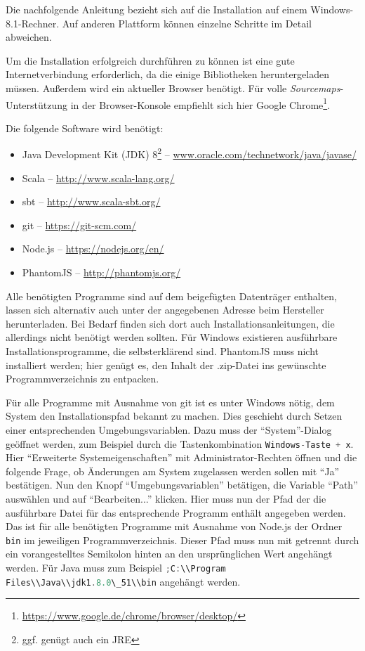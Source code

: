 \documentclass[a4paper, 12pt, hidelinks, listof=totoc, listoftables=totoc, bibliography=totoc]{scrreprt}
\newcommand{\code}[1]{\lstinline[language=Scala, style=inline]|#1|}
\begin{document}

Die nachfolgende Anleitung bezieht sich auf die Installation auf einem Windows-8.1-Rechner. Auf anderen Plattform können einzelne Schritte im Detail abweichen.

Um die Installation erfolgreich durchführen zu können ist eine gute Internetverbindung erforderlich, da die einige Bibliotheken heruntergeladen müssen. Außerdem wird ein aktueller Browser benötigt. Für volle \textit{Sourcemaps}-Unterstützung in der Browser-Konsole empfiehlt sich hier Google Chrome\footnote{\url{https://www.google.de/chrome/browser/desktop/}}.

Die folgende Software wird benötigt:

\begin{itemize}
	\item Java Development Kit (JDK) 8\footnote{ggf. genügt auch ein JRE}  --  \url{www.oracle.com/technetwork/java/javase/}
	\item Scala  --  \url{http://www.scala-lang.org/}
	\item sbt  --  \url{http://www.scala-sbt.org/}
	\item git  --  \url{https://git-scm.com/}
	\item Node.js  --  \url{https://nodejs.org/en/}
	\item PhantomJS  --  \url{http://phantomjs.org/}
\end{itemize}

Alle benötigten Programme sind auf dem beigefügten Datenträger enthalten, lassen sich alternativ auch unter der angegebenen Adresse beim Hersteller herunterladen. Bei Bedarf finden sich dort auch Installationsanleitungen, die allerdings nicht benötigt werden sollten. Für Windows existieren ausführbare Installationsprogramme, die selbsterklärend sind. PhantomJS muss nicht installiert werden; hier genügt es, den Inhalt der .zip-Datei ins gewünschte Programmverzeichnis zu entpacken.

Für alle Programme mit Ausnahme von git ist es unter Windows nötig, dem System den Installationspfad bekannt zu machen. Dies geschieht durch Setzen einer entsprechenden Umgebungsvariablen. Dazu muss der "`System"'-Dialog geöffnet werden, zum Beispiel durch die Tastenkombination \code{Windows-Taste + x}. Hier "`Erweiterte Systemeigenschaften"' mit Administrator-Rechten öffnen und die folgende Frage, ob Änderungen am System zugelassen werden sollen mit "`Ja"' bestätigen. Nun den Knopf "`Umgebungsvariablen"' betätigen, die Variable "`Path"' auswählen und auf "`Bearbeiten..."' klicken. Hier muss nun der Pfad der die ausführbare Datei für das entsprechende Programm enthält angegeben werden. Das ist für alle benötigten Programme mit Ausnahme von Node.js der Ordner \code{bin} im jeweiligen Programmverzeichnis. Dieser Pfad muss nun mit getrennt durch ein vorangestelltes Semikolon hinten an den ursprünglichen Wert angehängt werden. Für Java muss zum Beispiel \code{;C:\\Program Files\\Java\\jdk1.8.0\_51\\bin} angehängt werden.
\end{document}
